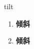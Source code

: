 
\begin{frame}
{\huge tilt}
\begin{center}
\begin{enumerate}\Large
  \item \textbf{倾斜}
  \item \textbf{倾斜}
\end{enumerate}
\end{center}
\end{frame}

